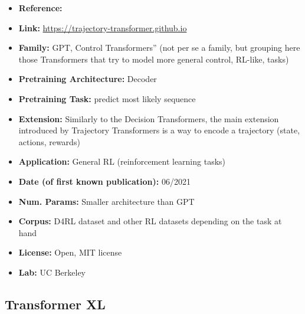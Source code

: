 \documentclass{article}
\begin{document}
            \begin{itemize}
                \item \textbf{Reference:} \href{https://arxiv.org/abs/2106.02039}{}
                \item \textbf{Link:} \url{https://trajectory-transformer.github.io}
                \item \textbf{Family:} GPT, Control Transformers” (not per se a family, but grouping here those Transformers that try to model more general control, RL-like, tasks) 
                \item \textbf{Pretraining Architecture:} Decoder
                \item \textbf{Pretraining Task:} predict most likely sequence
                \item \textbf{Extension:} Similarly to the Decision Transformers, the main extension introduced by Trajectory Transformers is a way to encode a trajectory (state, actions, rewards)  
                \item \textbf{Application:} General RL (reinforcement learning tasks)
                \item \textbf{Date (of first known publication):} 06/2021
                \item \textbf{Num. Params:} Smaller architecture than GPT
                \item \textbf{Corpus:} D4RL dataset and other RL datasets depending on the task at hand
                \item \textbf{License:} Open, MIT license
                \item \textbf{Lab:} UC Berkeley
            \end{itemize}

\subsection{Transformer XL}
\end{document}
